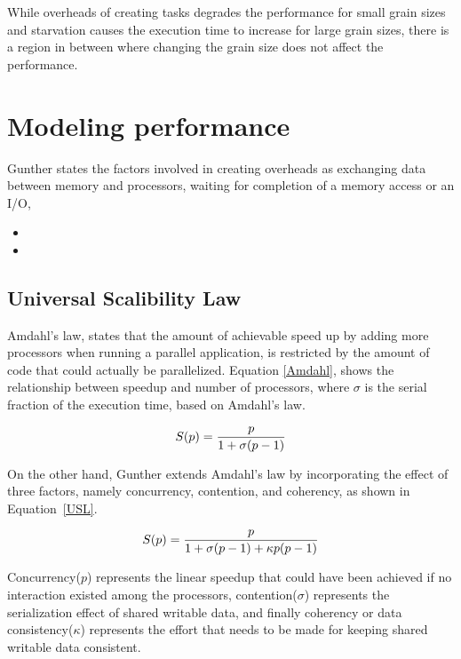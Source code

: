 While overheads of creating tasks degrades the performance for small grain sizes and starvation causes the execution time to increase for large grain sizes, there is a region in between where changing the grain size does not affect the performance. 

\vspace{\baselineskip}
\section{Modeling performance}
Gunther states the factors involved in creating overheads as exchanging data between memory and processors, waiting for completion of a memory access or an I/O, 
\begin{itemize}
	\item 
	\item
\end{itemize}

\vspace{\baselineskip}
\subsection{Universal Scalibility Law}
Amdahl's law\cite{amdahl1967validity}, states that the amount of achievable speed up by adding more processors when running a parallel application, is restricted by the amount of code that could actually be parallelized. 
Equation \ref{Amdahl}, shows the relationship between speedup and number of processors, where $\sigma$ is the serial fraction of the execution time, based on Amdahl's law\cite{gunther2007guerrilla}. 

\begin{equation}\label{Amdahl}
S(p) = \frac{p}{1+\sigma(p-1)}\\
\end{equation}

On the other hand, Gunther\cite{gunther2007guerrilla} extends Amdahl's law by incorporating the effect of three factors, namely concurrency, contention, and coherency, as shown in Equation~\ref{USL}.

\begin{equation}\label{USL}
S(p) = \frac{p}{1+\sigma(p-1)+\kappa{p}(p-1)}\\
\end{equation}

Concurrency($p$) represents the linear speedup that could have been achieved if no interaction existed among the processors, contention($\sigma$) represents the serialization effect of shared writable data, and finally coherency or data consistency($\kappa$) represents the effort that needs to be made for keeping shared writable data consistent\cite{gunther2007guerrilla}.    

